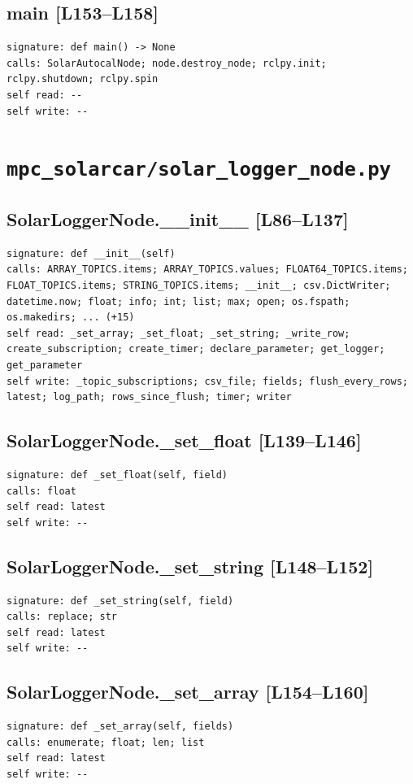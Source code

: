 \documentclass[a4paper,10pt,oneside]{book}
\begin{document}
\subsection*{main [L153--L158]}
\begin{lstlisting}[numbers=none]
signature: def main() -> None
calls: SolarAutocalNode; node.destroy_node; rclpy.init; rclpy.shutdown; rclpy.spin
self read: --
self write: --
\end{lstlisting}
\section{\texttt{mpc\_solarcar/solar\_logger\_node.py}}
\subsection*{SolarLoggerNode.\_\_init\_\_ [L86--L137]}
\begin{lstlisting}[numbers=none]
signature: def __init__(self)
calls: ARRAY_TOPICS.items; ARRAY_TOPICS.values; FLOAT64_TOPICS.items; FLOAT_TOPICS.items; STRING_TOPICS.items; __init__; csv.DictWriter; datetime.now; float; info; int; list; max; open; os.fspath; os.makedirs; ... (+15)
self read: _set_array; _set_float; _set_string; _write_row; create_subscription; create_timer; declare_parameter; get_logger; get_parameter
self write: _topic_subscriptions; csv_file; fields; flush_every_rows; latest; log_path; rows_since_flush; timer; writer
\end{lstlisting}
\subsection*{SolarLoggerNode.\_set\_float [L139--L146]}
\begin{lstlisting}[numbers=none]
signature: def _set_float(self, field)
calls: float
self read: latest
self write: --
\end{lstlisting}
\subsection*{SolarLoggerNode.\_set\_string [L148--L152]}
\begin{lstlisting}[numbers=none]
signature: def _set_string(self, field)
calls: replace; str
self read: latest
self write: --
\end{lstlisting}
\subsection*{SolarLoggerNode.\_set\_array [L154--L160]}
\begin{lstlisting}[numbers=none]
signature: def _set_array(self, fields)
calls: enumerate; float; len; list
self read: latest
self write: --
\end{lstlisting}
\end{document}

